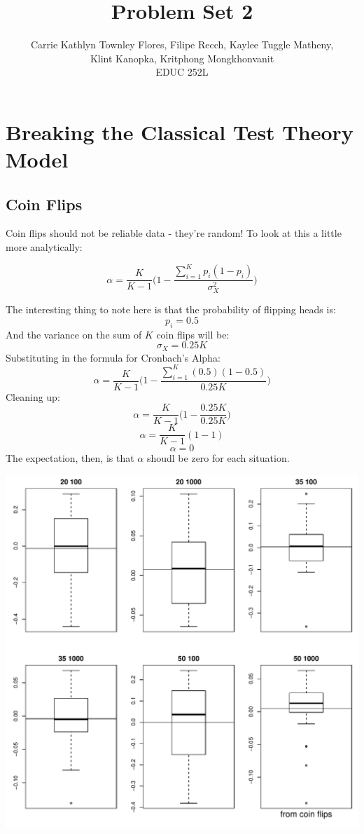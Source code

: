 \documentclass{article}\usepackage[]{graphicx}\usepackage[]{color}
\title{Problem Set 2}
\author{Carrie Kathlyn Townley Flores, Filipe Recch, Kaylee Tuggle Matheny, \\ Klint Kanopka, Kritphong Mongkhonvanit \\ EDUC 252L}
\makeatletter
\def\maxwidth{ %
  \ifdim\Gin@nat@width>\linewidth
    \linewidth
  \else
    \Gin@nat@width
  \fi
}
\newenvironment{knitrout}{}{} %
\makeatother
\begin{document}
\maketitle
\section{Breaking the Classical Test Theory Model}

  \subsection{Coin Flips}
    Coin flips should not be reliable data - they're random!  To look at this a little more analytically:
    
      \[ \alpha = \frac{K}{K-1}\Bigg(1-\frac{\sum_{i=1}^{K}p_i(1-p_i)}{\sigma_{X}^{2}}\Bigg)\]
    
    The interesting thing to note here is that the probability of flipping heads is:
      \[p_i = 0.5 \]
    And the variance on the sum of $K$ coin flips will be:
      \[ \sigma_X = 0.25K \]
    Substituting in the formula for Cronbach's Alpha:
      \[ \alpha = \frac{K}{K-1}\Bigg(1-\frac{\sum_{i=1}^{K}(0.5)(1-0.5)}{0.25K}\Bigg)\]
    Cleaning up:
      \[ \alpha = \frac{K}{K-1}\Bigg(1-\frac{0.25K}{0.25K}\Bigg)\]
      \[ \alpha = \frac{K}{K-1}(1-1)\]
      \[ \alpha = 0 \]
    The expectation, then, is that $\alpha$ shoudl be zero for each situation.


\begin{knitrout}
\color{fgcolor}
\includegraphics[width=\maxwidth]{figure/unnamed-chunk-2-1} 

\end{knitrout}
\end{document}
